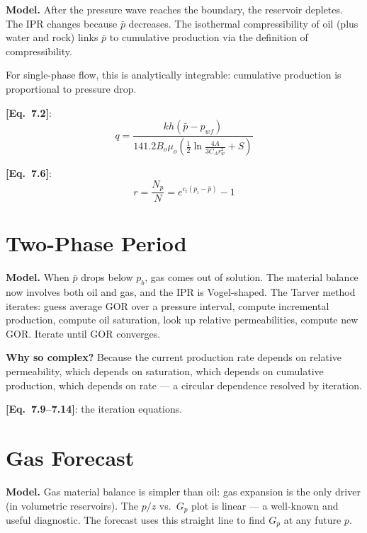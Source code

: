 \documentclass[11pt,a4paper,openany]{book}
\newcommand{\eqrefbook}[1]{\textcolor{blue!60!black}{\textbf{[Eq.~#1]}}}
\begin{document}
\begin{theory}
\textbf{Model.} After the pressure wave reaches the boundary, the
reservoir depletes. The IPR changes because $\bar{p}$ decreases. The
isothermal compressibility of oil (plus water and rock) links $\bar{p}$
to cumulative production via the definition of compressibility.

For single-phase flow, this is analytically integrable: cumulative
production is proportional to pressure drop.
\end{theory}

\eqrefbook{7.2}:
\begin{equation}
  q = \frac{kh(\bar{p} - p_{wf})}{141.2 B_o\mu_o\left(\frac{1}{2}
  \ln\frac{4A}{3C_Ar_w^2} + S\right)}
\end{equation}

\eqrefbook{7.6}:
\begin{equation}
  r = \frac{N_p}{N} = e^{c_t(p_i - \bar{p})} - 1
\end{equation}

\section{Two-Phase Period}

\begin{theory}
\textbf{Model.} When $\bar{p}$ drops below $p_b$, gas comes out of
solution. The material balance now involves both oil and gas, and the
IPR is Vogel-shaped. The Tarver method iterates: guess average GOR
over a pressure interval, compute incremental production, compute oil
saturation, look up relative permeabilities, compute new GOR. Iterate
until GOR converges.

\textbf{Why so complex?} Because the current production rate depends
on relative permeability, which depends on saturation, which depends
on cumulative production, which depends on rate — a circular
dependence resolved by iteration.
\end{theory}

\eqrefbook{7.9--7.14}: the iteration equations.

\section{Gas Forecast}

\begin{theory}
\textbf{Model.} Gas material balance is simpler than oil: gas
expansion is the only driver (in volumetric reservoirs). The
$p/z$ vs.\ $G_p$ plot is linear — a well-known and useful diagnostic.
The forecast uses this straight line to find $G_p$ at any future $p$.
\end{theory}
\end{document}
